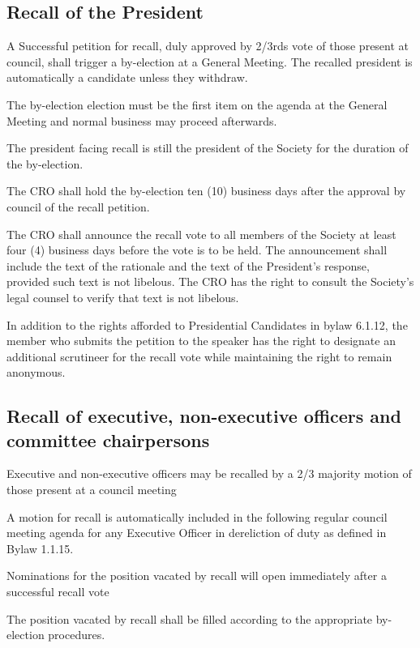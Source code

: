 \subsection{Recall of the President}
\begin{longenum}[ label*=\thesubsection.\arabic*., align=left]
	\item A Successful petition for recall, duly approved by 2/3rds vote of those present at council, shall trigger a by-election at a General Meeting. The recalled president is automatically a candidate unless they withdraw.
    \begin{longenum}[ label*=\arabic*., align=left]
		\item The by-election election must be the first item on the agenda at the General Meeting and normal business may proceed afterwards.
	\end{longenum}
    \item The president facing recall is still the president of the Society for the duration of the by-election.
    \item The CRO shall hold the by-election ten (10) business days after the approval by council of the recall petition.
    \item The CRO shall announce the recall vote to all members of the Society at least four (4) business days before the vote is to be held. The announcement shall include the text of the rationale and the text of the President's response, provided such text is not libelous. The CRO has the right to consult the Society's legal counsel to verify that text is not libelous.
    \item In addition to the rights afforded to Presidential Candidates in bylaw 6.1.12, the member who submits the petition to the speaker has the right to designate an additional scrutineer for the recall vote while maintaining the right to remain anonymous.
\end{longenum}
\subsection {Recall of executive, non-executive officers and committee chairpersons}
\begin{longenum}[ label*=\thesubsection.\arabic*., align=left]
	\item Executive and non-executive officers may be recalled by a 2/3 majority motion of those present at a council meeting
    \item A motion for recall is automatically included in the following regular council meeting agenda for any Executive Officer in dereliction of duty as defined in Bylaw 1.1.15.
    \item Nominations for the position vacated by recall will open immediately after a successful recall vote
    \item The position vacated by recall shall be filled according to the appropriate by-election procedures.
\end{longenum}


